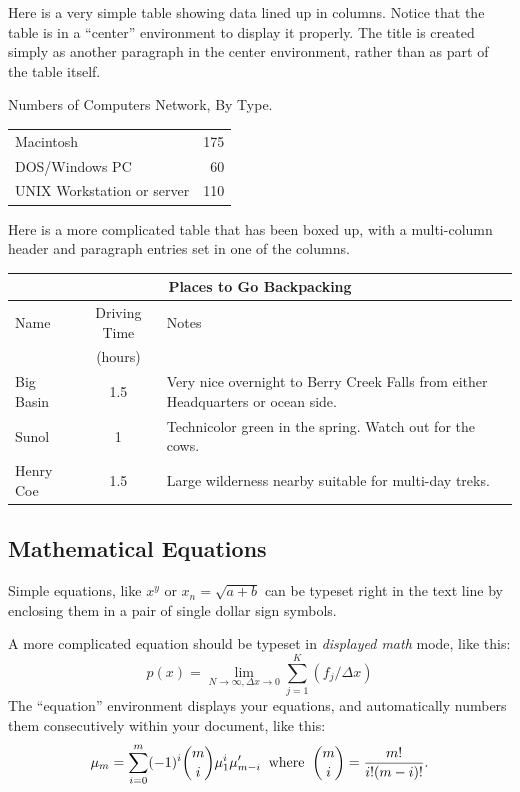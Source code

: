 \documentclass[11pt,oneside]{book}
\begin{document}
Here is a very simple table showing data lined up in columns.
Notice that the table is in a ``center'' environment to display
it properly.
The title is created simply as another paragraph in the center environment,
rather than as part of the table itself.
\begin{center}
Numbers of Computers Network, By Type.

\begin{tabular}{lr}
Macintosh&175\\
DOS/Windows PC&60\\
UNIX Workstation or server&110\\
\end{tabular}
\end{center}

Here is a more complicated table that has been boxed up, with a multi-column
header and paragraph entries set in one of the columns.
\begin{center}
\begin{tabular}{|l|c|p{3.5in}|}
\hline
\multicolumn{3}{|c|}{Places to Go Backpacking}\\ \hline
Name&Driving Time&Notes\\
&(hours)&\\ \hline
Big Basin&1.5&Very nice overnight to Berry Creek Falls from
either Headquarters or ocean side.\\ \hline
Sunol&1&Technicolor green in the spring.  Watch out for the cows.\\ \hline
Henry Coe&1.5&Large wilderness nearby suitable for multi-day treks.\\ \hline
\end{tabular}
\end{center}

\subsection {Mathematical Equations}
Simple equations, like $x^y$ or $x_n = \sqrt{a + b}$ can be typeset right
in the text line by enclosing them in a pair of single dollar sign symbols.

A more complicated equation should be typeset in {\em displayed math\/} mode,
like this:
\[
p(x)=\lim_{N \rightarrow \infty, \Delta x \rightarrow 0}\sum_{j=1}^{K}(f_j/\Delta x)
\]
The ``equation'' environment displays your equations, and automatically
numbers them consecutively within your document, like this:
\begin{equation}
\mu_m=\sum_{i=0}^m(-1)^i{m \choose i}\mu_1^i\mu_{m-i}^{\prime} \; \; {\rm where} \; \; {m \choose i}={m! \over i!(m-i)!}.
\label{eq:summation1}
\end{equation}
\end{document}
